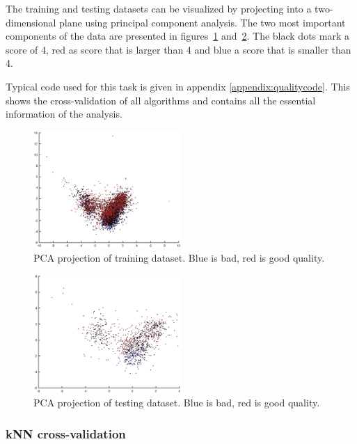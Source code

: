 \documentclass[twoside]{article}
\begin{document}
\begin{multicols}{2}
The training and testing datasets can be visualized by projecting into a two-dimensional plane using principal component analysis. The 
two most important components of the data are presented in figures~\ref{fig:quality_training_pca} and~\ref{fig:quality_testing_pca}.
The black dots mark a score of 4, red as score that is larger than 4 and blue a score that is smaller than 4.

Typical code used for this task is given in appendix \ref{appendix:qualitycode}. This shows the cross-validation of all algorithms and
contains all the essential information of the analysis.

\begin{figure}[H]
\centering
\includegraphics[width=0.5\textwidth]{qpcatraining}
\caption{PCA projection of training dataset. Blue is bad, red is good quality.}
\label{fig:quality_training_pca}
\end{figure}

\begin{figure}[H]
\centering
\includegraphics[width=0.5\textwidth]{qpcatesting}
\caption{PCA projection of testing dataset. Blue is bad, red is good quality.}
\label{fig:quality_testing_pca}
\end{figure}

\subsubsection{kNN cross-validation}


\end{multicols}
\end{document}

